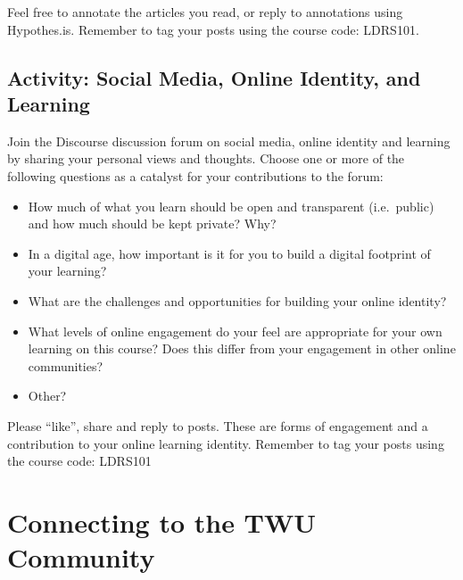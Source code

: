 \documentclass[
]{book}
\providecommand{\tightlist}{%
  \setlength{\itemsep}{0pt}\setlength{\parskip}{0pt}}
\theoremstyle{definition}
\theoremstyle{definition}
\theoremstyle{definition}
\theoremstyle{definition}
\theoremstyle{remark}
\begin{document}
\begin{feedback}
Feel free to annotate the articles you read, or reply to annotations using Hypothes.is. Remember to tag your posts using the course code: LDRS101.
\end{feedback}

\hypertarget{activity-social-media-online-identity-and-learning}{%
\subsection*{Activity: Social Media, Online Identity, and Learning}\label{activity-social-media-online-identity-and-learning}}

\begin{reflect}
Join the Discourse discussion forum on social media, online identity and learning by sharing your personal views and thoughts. Choose one or more of the following questions as a catalyst for your contributions to the forum:

\begin{itemize}
\tightlist
\item
  How much of what you learn should be open and transparent (i.e.~public) and how much should be kept private? Why?\\
\item
  In a digital age, how important is it for you to build a digital footprint of your learning?\\
\item
  What are the challenges and opportunities for building your online identity?\\
\item
  What levels of online engagement do your feel are appropriate for your own learning on this course? Does this differ from your engagement in other online communities?\\
\item
  Other?
\end{itemize}

Please ``like'', share and reply to posts. These are forms of engagement and a contribution to your online learning identity. Remember to tag your posts using the course code: LDRS101
\end{reflect}

\hypertarget{connecting-to-the-twu-community}{%
\section{Connecting to the TWU Community}\label{connecting-to-the-twu-community}}
\end{document}
